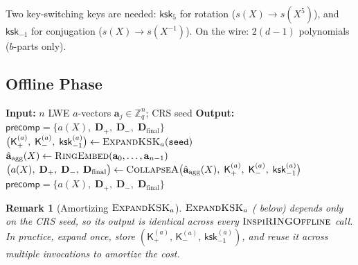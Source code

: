 \documentclass[11pt,a4paper]{article}
\newcommand{\Z}{\mathbb{Z}}
\newtheorem{remark}{Remark}
\begin{document}
Two key-switching keys are needed:
$\mathsf{ksk}_5$ for rotation ($s(X) \to s(X^5)$), and
$\mathsf{ksk}_{-1}$ for conjugation ($s(X) \to s(X^{-1})$).
On the wire: $2(d\!-\!1)$ polynomials ($b$-parts only).

\subsection{Offline Phase}\label{sec:packing-offline}

\begin{algorithm}[H]
\caption{$\textsc{InspiRINGOffline}(\mathbf{a}_0, \ldots, \mathbf{a}_{n-1},\; \texttt{seed})$}
\label{alg:pack-offline}
\begin{algorithmic}[1]
\State \textbf{Input:} $n$ LWE $a$-vectors $\mathbf{a}_j \in \Z_q^n$; CRS seed
\State \textbf{Output:} $\mathsf{precomp} = \{a(X),\; \mathbf{D}_{+},\; \mathbf{D}_{-},\; \mathbf{D}_{\mathrm{final}}\}$
\Statex
\State $\bigl(\mathsf{K}_{+}^{(a)},\; \mathsf{K}_{-}^{(a)},\; \mathsf{ksk}_{-1}^{(a)}\bigr) \gets \textsc{ExpandKSK}_a(\texttt{seed})$ 
\State $\hat{\mathbf{a}}_{\mathrm{agg}}(X) \gets \textsc{RingEmbed}(\mathbf{a}_0, \ldots, \mathbf{a}_{n-1})$ 
\State $\bigl(a(X),\; \mathbf{D}_{+},\; \mathbf{D}_{-},\; \mathbf{D}_{\mathrm{final}}\bigr) \gets \textsc{CollapseA}\bigl(\hat{\mathbf{a}}_{\mathrm{agg}}(X),\; \mathsf{K}_{+}^{(a)},\; \mathsf{K}_{-}^{(a)},\; \mathsf{ksk}_{-1}^{(a)}\bigr)$ 
\State \Return $\mathsf{precomp} = \{a(X),\; \mathbf{D}_{+},\; \mathbf{D}_{-},\; \mathbf{D}_{\mathrm{final}}\}$
\end{algorithmic}
\end{algorithm}

\begin{remark}[Amortizing $\textsc{ExpandKSK}_a$]
$\textsc{ExpandKSK}_a$ ( below) depends only on the CRS seed, so its output is identical across every $\textsc{InspiRINGOffline}$ call.
In practice, expand once, store $(\mathsf{K}_{+}^{(a)},\, \mathsf{K}_{-}^{(a)},\, \mathsf{ksk}_{-1}^{(a)})$, and reuse it across multiple invocations to amortize the cost.
\end{remark}
\end{document}
